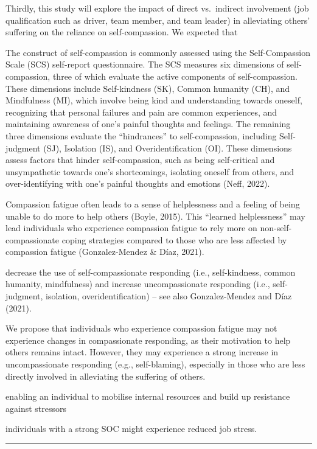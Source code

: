 \documentclass[
  man]{apa7}
\begin{document}
Thirdly, this study will explore the impact of direct vs.~indirect involvement (job qualification such as driver, team member, and team leader) in alleviating others' suffering on the reliance on self-compassion. We expected that

The construct of self-compassion is commonly assessed using the Self-Compassion Scale (SCS) self-report questionnaire. The SCS measures six dimensions of self-compassion, three of which evaluate the active components of self-compassion. These dimensions include Self-kindness (SK), Common humanity (CH), and Mindfulness (MI), which involve being kind and understanding towards oneself, recognizing that personal failures and pain are common experiences, and maintaining awareness of one's painful thoughts and feelings. The remaining three dimensions evaluate the ``hindrances'' to self-compassion, including Self-judgment (SJ), Isolation (IS), and Overidentification (OI). These dimensions assess factors that hinder self-compassion, such as being self-critical and unsympathetic towards one's shortcomings, isolating oneself from others, and over-identifying with one's painful thoughts and emotions (Neff, 2022).

Compassion fatigue often leads to a sense of helplessness and a feeling of being unable to do more to help others (Boyle, 2015). This ``learned helplessness'' may lead individuals who experience compassion fatigue to rely more on non-self-compassionate coping strategies compared to those who are less affected by compassion fatigue (Gonzalez-Mendez \& Díaz, 2021).

decrease the use of self-compassionate responding (i.e., self-kindness, common humanity, mindfulness) and increase uncompassionate responding (i.e., self-judgment, isolation, overidentification) -- see also Gonzalez-Mendez and Díaz (2021).

We propose that individuals who experience compassion fatigue may not experience changes in compassionate responding, as their motivation to help others remains intact. However, they may experience a strong increase in uncompassionate responding (e.g., self-blaming), especially in those who are less directly involved in alleviating the suffering of others.

enabling an individual to mobilise internal resources and build up resistance against stressors

individuals with a strong SOC might experience reduced job stress.

\begin{center}\rule{0.5\linewidth}{0.5pt}\end{center}
\end{document}
